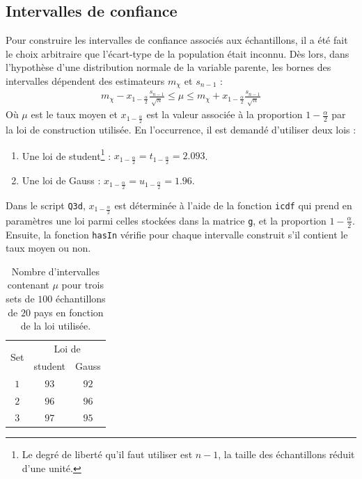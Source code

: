 \documentclass[a4paper, 12pt]{article}
\begin{document}
	\subsection{Intervalles de confiance} \label{sec:Q3d}
	Pour construire les intervalles de confiance associés aux échantillons, il a été fait le choix arbitraire que l'écart-type de la population était inconnu. Dès lors, dans l'hypothèse d'une distribution normale de la variable parente, les bornes des intervalles dépendent des estimateurs $m_{\chi}$ et $s_{n-1}$ :
	\begin{align*}
	    m_{\chi} - x_{1 - \frac{\alpha}{2}} \frac{s_{n-1}}{\sqrt{n}} \leq \mu \leq m_{\chi} + x_{1 - \frac{\alpha}{2}} \frac{s_{n-1}}{\sqrt{n}}
	\end{align*}
	Où $\mu$ est le taux moyen et $x_{1 - \frac{\alpha}{2}}$ est la valeur associée à la proportion $1 - \frac{\alpha}{2}$ par la loi de construction utilisée. En l'occurrence, il est demandé d'utiliser deux lois :
	\begin{enumerate}[noitemsep, label=\roman*.]
	    \item Une loi de student\footnote{Le degré de liberté qu'il faut utiliser est $n-1$, \cad la taille des échantillons réduit d'une unité.} : $x_{1 - \frac{\alpha}{2}} = t_{1 - \frac{\alpha}{2}} =  \num{2.093}$.
	    \item Une loi de Gauss : $x_{1 - \frac{\alpha}{2}} = u_{1 - \frac{\alpha}{2}} = \num{1.96}$.
	\end{enumerate}
	Dans le script \texttt{Q3d}, $x_{1 - \frac{\alpha}{2}}$ est déterminée à l'aide de la fonction \texttt{icdf} qui prend en paramètres une loi parmi celles stockées dans la matrice \texttt{g}, et la proportion $1 - \frac{\alpha}{2}$. Ensuite, la fonction \texttt{hasIn} vérifie pour chaque intervalle construit s'il contient le taux moyen ou non. \par
	\begin{table}[h!]
		\centering
		\begin{tabular}{|c|c|c|}
			\hline
			\multirow{2}{*}{Set} & \multicolumn{2}{c|}{Loi de} \\ \cline{2-3}
			                     &  student   &     Gauss      \\ \hline\hline
			        $1$          & $\num{93}$ &   $\num{92}$   \\ \hline
			        $2$          & $\num{96}$ &   $\num{96}$   \\ \hline
			        $3$          & $\num{97}$ &   $\num{95}$   \\ \hline
		\end{tabular}
		\caption{Nombre d'intervalles contenant $\mu$ pour trois sets de $100$ échantillons de $20$ pays en fonction de la loi utilisée.}
		\label{table:Q3d}
	\end{table}
\end{document}
